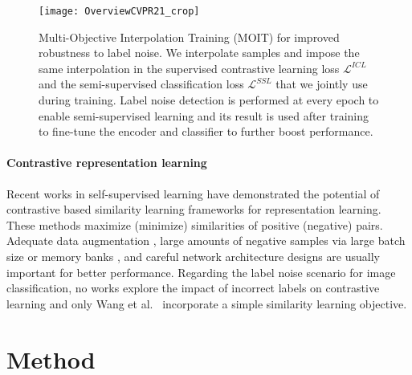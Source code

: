 \documentclass[final]{cvpr}
\begin{document}
\begin{figure*}[t]
\centering{}\texttt{[image: OverviewCVPR21\_crop]}\caption{\label{fig:Overview}Multi-Objective Interpolation Training (MOIT) for improved robustness to label noise. We interpolate samples and impose the same interpolation in the supervised contrastive learning loss $\mathcal{L}^{\mathit{ICL}}$ and the semi-supervised classification loss $\mathcal{L}^{\mathit{SSL}}$ that we jointly use during training. Label noise detection is performed at every epoch to enable semi-supervised learning and its result is used after training to fine-tune the encoder and classifier to further boost performance.}
\end{figure*}

\paragraph{Contrastive representation learning}
Recent works in self-supervised learning \cite{2020_IEEE_COntrastiveSurvey, 2020_ICML_SimCLR,2020_arXiv_SupContLearn} have demonstrated the potential of contrastive based similarity learning frameworks for representation learning. These methods maximize (minimize) similarities of positive (negative) pairs. Adequate data augmentation \cite{2020_NeurIPS_GoodViews}, large amounts of negative samples via large batch size \cite{2020_ICML_SimCLR} or memory banks \cite{2020_CVPR_MoCo,2020_CVPR_XBM}, and careful network architecture designs \cite{2020_arXiv_MoCoV2} are usually important for better performance. Regarding the label noise scenario for image classification, no works explore the impact of incorrect labels on contrastive learning and only Wang et al.~\cite{2018_CVPR_IterativeNoise}  incorporate a simple similarity learning objective.






\section{Method}
\end{document}
